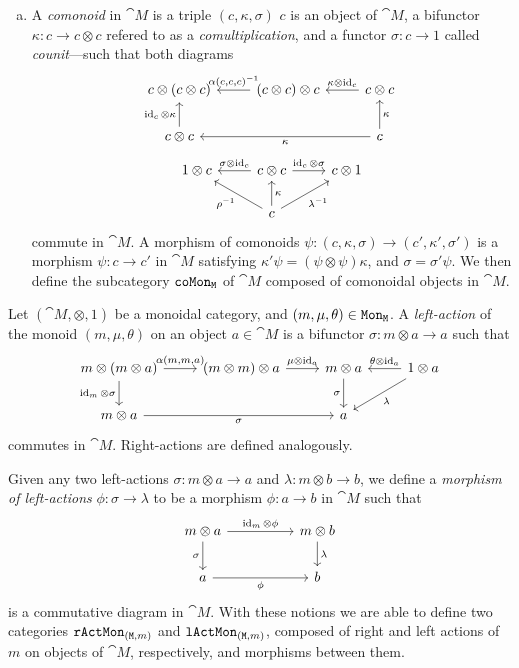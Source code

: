 \documentclass[../../deep-dive]{subfiles}
\begin{document}
\begin{definition}
\begin{enumerate}[(a)]
\item A \emph{comonoid} in \(\cat M\) is a triple \((c, \kappa, \sigma)\)
  \(c\) is an object of \(\cat M\), a bifunctor \(\kappa: c \to c \otimes c\)
  refered to as a \emph{comultiplication}, and a functor \(\sigma: c \to 1\)
  called \emph{counit}---such that both diagrams
  \[
  \begin{tikzcd}
  c \otimes (c \otimes c)
  &(c \otimes c) \otimes c
  \ar[l, "{\alpha(c, c, c)^{-1}}"']
  &c \otimes c
  \ar[l, "\kappa \otimes \Id_c"']
  \\
  c \otimes c
  \ar[u, "\Id_c \otimes \kappa"]
  &&c \ar[ll, "\kappa"] \ar[u, "\kappa"']
  \end{tikzcd}
  \]
  \[
  \begin{tikzcd}
  1 \otimes c
  & c \otimes c
  \ar[l, "\sigma \otimes \Id_c"']
  \ar[r, "\Id_c \otimes \sigma"]
  &c \otimes 1
  \\
  &c \ar[u, "\kappa"'] \ar[lu, "\rho^{-1}"] \ar[ru, "\lambda^{-1}"'] &
  \end{tikzcd}
  \]
  commute in \(\cat M\). A morphism of comonoids
  \(\psi: (c, \kappa, \sigma) \to (c', \kappa', \sigma')\) is a morphism
  \(\psi: c \to c'\) in \(\cat M\) satisfying
  \(\kappa' \psi = (\psi \otimes \psi) \kappa\), and \(\sigma = \sigma'
  \psi\). We then define the subcategory \({\texttt{coMon}}_{\texttt M}\) of \(\cat M\)
  composed of comonoidal objects in \(\cat M\).
\end{enumerate}
\end{definition}

\begin{definition}
\label{def:monoid-actions}
Let \((\cat M, \otimes, 1)\) be a monoidal category, and
\((m, \mu, \theta) \in {\texttt{Mon}}_{\texttt M}\). A \emph{left-action} of the monoid
\((m, \mu, \theta)\) on an object \(a \in \cat M\) is a bifunctor
\(\sigma: m \otimes a \to a\) such that
\[
\begin{tikzcd}
m \otimes (m \otimes a)
\ar[r, "{\alpha(m, m, a)}"]
\ar[d, "\Id_m \otimes \sigma"']
&(m \otimes m) \otimes a
\ar[r, "\mu \otimes \Id_a"]
&m \otimes a
\ar[d, "\sigma"']
&1 \otimes a
\ar[l, "\theta \otimes \Id_a"']
\ar[ld, "\lambda"]
\\
m \otimes a \ar[rr, "\sigma"']
&
&a
&
\end{tikzcd}
\]
commutes in \(\cat M\). Right-actions are defined analogously.

Given any two left-actions \(\sigma: m \otimes a \to a\) and
\(\lambda: m \otimes b \to b\), we define a \emph{morphism of left-actions}
\(\phi: \sigma \to \lambda\) to be a morphism \(\phi: a \to b\) in \(\cat M\)
such that
\[
\begin{tikzcd}
m \otimes a
\ar[d, "\sigma"']
\ar[rr, "\Id_m \otimes \phi"]
&&m \otimes b \ar[d, "\lambda"]
\\
a \ar[rr, "\phi"']
&&b
\end{tikzcd}
\]
is a commutative diagram in \(\cat M\). With these notions we are able to define
two categories \({\texttt{rActMon}}_{(\texttt M, m)}\) and \({\texttt{lActMon}}_{(\texttt M, m)}\),
composed of right and left actions of \(m\) on objects of \(\cat M\),
respectively, and morphisms between them.
\end{definition}
\end{document}
